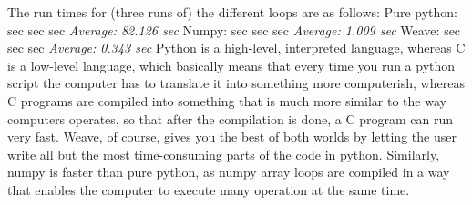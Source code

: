 \documentclass[a4paper]{article}
\begin{document}
The run times for (three runs of) the different loops are as follows:\newline
Pure python: sec sec sec\newline
\emph{Average: 82.126 sec}\newline\newline
Numpy: sec sec sec\newline
\emph{Average: 1.009 sec}\newline\newline
Weave: sec sec sec\newline
\emph{Average: 0.343 sec}\newline\newline
Python is a high-level, interpreted language, whereas C is a low-level language, which basically means that every time you run a python script the computer has to translate it into something more computerish, whereas C programs are compiled into something that is much more similar to the way computers operates, so that after the compilation is done, a C program can run very fast. Weave, of course, gives you the best of both worlds by letting the user write all but the most time-consuming parts of the code in python. Similarly, numpy is faster than pure python, as numpy array loops are compiled in a way that enables the computer to execute many operation at the same time.





\end{document}
